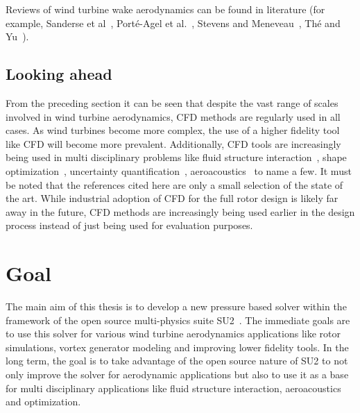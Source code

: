 Reviews of wind turbine wake aerodynamics can be found in literature (for example, Sanderse et al~\cite{sandresereview},  Port{\'e}-Agel et al.~\cite{porte2020wind}, Stevens and Meneveau~\cite{stevensreview}, Th{\'e} and Yu~\cite{criticalreview}).



\subsection*{Looking ahead}
From the preceding section it can be seen that despite the vast range of scales involved in wind turbine aerodynamics, CFD methods are regularly used in all cases. As wind turbines become more complex, the use of a higher fidelity tool like CFD will become more prevalent. Additionally, CFD tools are increasingly being used in multi disciplinary problems like fluid structure interaction~\cite{hsu2012fsi, wang2016fsi, airfoilfsi}, shape optimization~\cite{madsenshapeopt, dhertshapeopt}, uncertainty quantification~\cite{andresuq, hsiehuq}, aeroacoustics~\cite{luolesacoust, edisonacoust} to name a few. It must be noted that the references cited here are only a small selection of the state of the art. While industrial adoption of CFD for the full rotor design is likely far away in the future, CFD methods are increasingly being used earlier in the design process instead of just being used for evaluation purposes. 

\section{Goal}

The main aim of this thesis is to develop a new pressure based solver within the framework of the open source multi-physics suite SU2~\cite{SU22013}. The immediate goals are to use this solver for various wind turbine aerodynamics applications like rotor simulations, vortex generator modeling and improving lower fidelity tools. In the long term, the goal is to take advantage of the open source nature of SU2 to not only improve the solver for aerodynamic applications but also to use it as a base for multi disciplinary applications like fluid structure interaction, aeroacoustics and optimization. 

